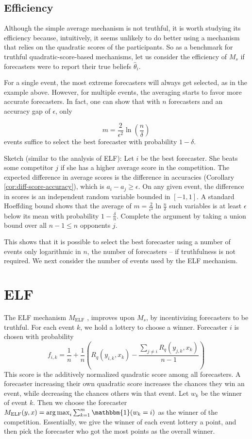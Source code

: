 \documentclass[letterpaper,12pt]{article}
\DeclareMathOperator*{\argmax}{arg\,max}
\newcommand{\1}{\mathbbm{1}}
\begin{document}
\subsection{Efficiency}
Although the simple average mechanism is not truthful, it is worth studying its efficiency because, intuitively, it seems unlikely to do better using a mechanism that relies on the quadratic scores of the participants.
So as a benchmark for truthful quadratic-score-based mechanisms, let us consider the efficiency of $M_s$ if forecasters were to report their true beliefs $\hat \theta_i$.

For a single event, the most extreme forecasters will always get selected, as in the example above.
However, for multiple events, the averaging starts to favor more accurate forecasters.
In fact, one can show that with $n$ forecasters and an accuracy gap of $\epsilon$, only

  \[ m = \frac{2}{\epsilon^2}\ln\left(\frac{n}{\delta}\right) \]
events suffice to select the best forecaster with probability $1-\delta$.

Sketch (similar to the \citet{witkowski2018incentive} analysis of ELF): Let $i$ be the best forecaster.
She beats some competitor $j$ if she has a higher average score in the competition.
The expected difference in average scores is the difference in accuracies (Corollary \ref{cor:diff-score-accuracy}), which is $a_i - a_j \geq \epsilon$.
On any given event, the difference in scores is an independent random variable bounded in $[-1,1]$.
A standard Hoeffding bound \cite{Bo:todo-cite-or-reference}  shows that the average of $m = \frac{2}{\epsilon^2}\ln\tfrac{n}{\delta}$ such variables is at least $\epsilon$ below its mean with probability $1 - \tfrac{\delta}{n}$.
Complete the argument by taking a union bound over all $n-1 \leq n$ opponents $j$.

This shows that it is possible to select the best forecaster using a number of events only logarithmic in $n$, the number of forecasters -- if truthfulness is not required.
We next consider the number of events used by the ELF mechanism.

\section{ELF}
\newcommand{\elf}{M_{\mathrm{ELF}}}
The ELF mechanism $\elf$ \citep{witkowski2018incentive}, improves upon $M_s$, by incentivizing forecasters to be truthful. For each event $k$, we hold a lottery to choose a winner. Forecaster $i$ is chosen with probability
\[ f_{i, k} = \frac{1}{n} + \frac{1}{n} \left(R_q(y_{i, k}, x_k) - \frac{\sum_{j\neq i} R_q(y_{j, k}, x_k)}{n-1} \right)\]
This score is the additively normalized quadratic score among all forecasters. A forecaster increasing their own quadratic score increases the chances they win an event, while decreasing the chances others win that event. Let $w_k$ be the winner of event $k$. Then we choose the forecaster $\elf(y, x) = \argmax_i \sum_{k=1}^m \1(w_k = i)$ as the winner of the competition. Essentially, we give the winner of each event lottery a point, and then pick the forecaster who got the most points as the overall winner.
\end{document}
